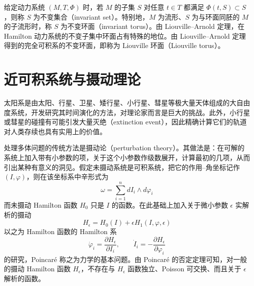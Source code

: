 给定动力系统 $(M,T,\Phi)$ 时，若 $M$ 的子集 $S$ 对任意 $t\in T$ 都满足 $\Phi(t,S)\subset S$，则称 $S$ 为不变集合（invariant set）。特别地，$M$ 为流形、$S$ 为与环面同胚的 $M$ 的子流形时，称 $S$ 为不变环面（invariant torus）。由 Liouville--Arnold 定理，在 Hamilton 动力系统的不变子集中环面占有特殊的地位。由 Liouville--Arnold 定理得到的完全可积系的不变环面，即称为 Liouville 环面（Liouville torus）。



\section{近可积系统与摄动理论}

太阳系是由太阳、行星、卫星、矮行星、小行星、彗星等极大量天体组成的大自由度系统，开发研究其时间演化的方法，对理论家而言是巨大的挑战。此外，小行星或彗星的碰撞有可能引发大量灭绝（extinction event），因此精确计算它们的轨道对人类存续也具有实用上的价值。

处理多体问题的传统方法是摄动论（perturbation theory）。其做法是：在可解的系统上加入带有小参数的项，关于这个小参数作级数展开，计算最初的几项，从而引出某种有意义的洞见。假定未摄动系统是可积系统，把它的作用–角坐标记作 $(I,\varphi)$，则在该坐标系中辛形式为
\begin{equation}
  \omega=\sum_{i=1}^{n}dI_i\wedge d\varphi_i
  \tag{7.2.1}
\end{equation}
而未摄动 Hamilton 函数 $H_0$ 只是 $I$ 的函数。在此基础上加入关于微小参数 $\epsilon$ 实解析的摄动
\begin{equation}
  H_{\epsilon}=H_0(I)+\epsilon H_1(I,\varphi,\epsilon)
  \tag{7.2.2}
\end{equation}
以之为 Hamilton 函数的 Hamilton 系
\begin{equation}
  \dot{\varphi}_i=\frac{\partial H_{\epsilon}}{\partial I_i},\qquad
  \dot{I}_i=-\frac{\partial H_{\epsilon}}{\partial\varphi_i}
  \tag{7.2.3}
\end{equation}
的研究，Poincaré 称之为力学的基本问题。由 Poincaré 的否定定理可知，对一般的摄动 Hamilton 函数 $H_{\epsilon}$，不存在与 $H_{\epsilon}$ 函数独立、Poisson 可交换、而且关于 $\epsilon$ 解析的函数。


